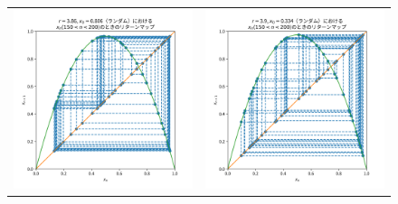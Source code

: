 \begin{figure}[htbp]
\begin{tabular}{cc}
    \begin{minipage}[t]{0.45\hsize}
      \centering
      \includegraphics[keepaspectratio, scale=0.3]{images/Problem3/report4_5.png}
    \end{minipage} &
    \begin{minipage}[t]{0.45\hsize}
      \centering
      \includegraphics[keepaspectratio, scale=0.3]{images/Problem3/report4_6.png}
    \end{minipage}
  \end{tabular}
\end{figure}
